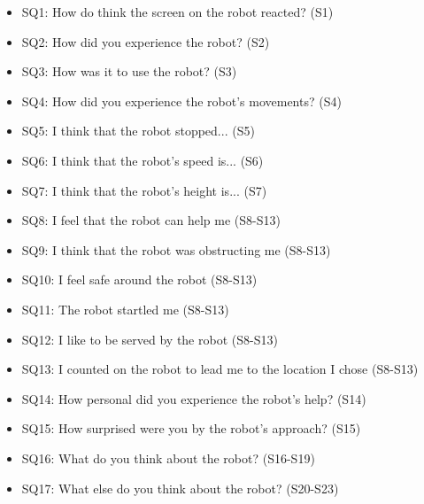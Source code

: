 \documentclass[paperwidth=160cm,paperheight=100cm,landscape,fontscale=0.3010]{baposter}
\begin{document}
\begin{poster}
{\begin{itemize}
	\setlength\itemsep{-2em}
	\item SQ1: How do think the screen on the robot reacted? (S1)\\
	\item SQ2: How did you experience the robot? (S2)\\
	\item SQ3: How was it to use the robot? (S3)\\
	\item SQ4: How did you experience the robot's movements? (S4) \\
	\item SQ5: I think that the robot stopped... (S5)\\
	\item SQ6: I think that the robot's speed is... (S6)\\
	\item SQ7: I think that the robot's height is... (S7)\\
	\item SQ8: I feel that the robot can help me (S8-S13)\\
	\item SQ9: I think that the robot was obstructing me (S8-S13)\\
	\item SQ10: I feel safe around the robot (S8-S13)\\
	\item SQ11: The robot startled me (S8-S13)\\
	\item SQ12: I like to be served by the robot (S8-S13)\\
	\item SQ13: I counted on the robot to lead me to the location I chose (S8-S13)\\
	\item SQ14: How personal did you experience the robot's help? (S14)\\
	\item SQ15: How surprised were you by the robot's approach? (S15)\\
	\item SQ16: What do you think about the robot? (S16-S19)\\
 	\item SQ17: What else do you think about the robot? (S20-S23)\\\vspace{-15pt}
\end{itemize}


}
\end{poster}
\end{document}
